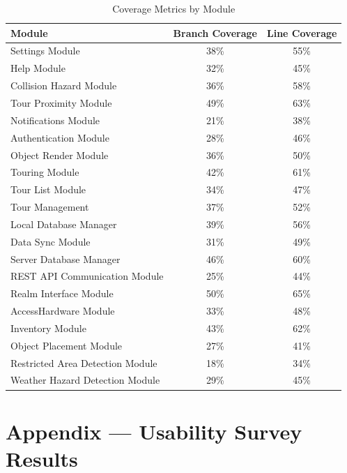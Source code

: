 \documentclass[12pt, titlepage]{article}
\begin{document}
\begin{table}[h!]
  \centering
  \begin{tabular}{lcc}
  \hline
  \textbf{Module} & \textbf{Branch Coverage} & \textbf{Line Coverage} \\
  \hline
  Settings Module                    & 38\% & 55\% \\
  Help Module                        & 32\% & 45\% \\
  Collision Hazard Module            & 36\% & 58\% \\
  Tour Proximity Module              & 49\% & 63\% \\
  Notifications Module               & 21\% & 38\% \\
  Authentication Module              & 28\% & 46\% \\
  Object Render Module               & 36\% & 50\% \\
  Touring Module                     & 42\% & 61\% \\
  Tour List Module                   & 34\% & 47\% \\
  Tour Management                    & 37\% & 52\% \\
  Local Database Manager             & 39\% & 56\% \\
  Data Sync Module                   & 31\% & 49\% \\
  Server Database Manager            & 46\% & 60\% \\
  REST API Communication Module      & 25\% & 44\% \\
  Realm Interface Module             & 50\% & 65\% \\
  AccessHardware Module              & 33\% & 48\% \\
  Inventory Module                   & 43\% & 62\% \\
  Object Placement Module            & 27\% & 41\% \\
  Restricted Area Detection Module   & 18\% & 34\% \\
  Weather Hazard Detection Module    & 29\% & 45\% \\
  \hline
  \end{tabular}
  \caption{Coverage Metrics by Module}
  \label{tab:coverage-metrics}
  \end{table}
  




\newpage{}
\section*{Appendix --- Usability Survey Results}
\end{document}
